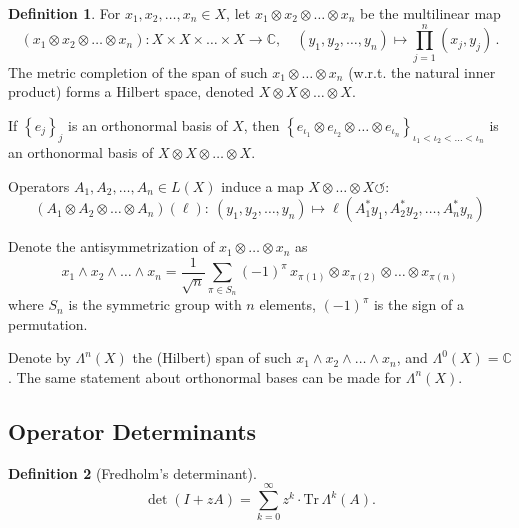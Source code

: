 \documentclass[a4paper]{article}
\newcommand{\Tr}{\textrm{Tr}\,}
\newcommand{\bbC}{\mathbb{C}}
\theoremstyle{definition}
\newtheorem{definition}{Definition}[section]
\theoremstyle{remark}
\theoremstyle{remark}
\begin{document}
\begin{definition}
    For $x_1, x_2, \ldots, x_n \in X$, let $x_1 \otimes x_2 \otimes \ldots \otimes x_n$ be the multilinear map 
    \begin{equation}
        (x_1 \otimes x_2 \otimes \ldots \otimes x_n) : X \times X \times \ldots \times X \to \bbC, \quad (y_1, y_2, \ldots, y_n) \mapsto \prod_{j=1}^{n} (x_j, y_j) \,. 
    \end{equation}
    The metric completion of the span of such $x_1 \otimes \ldots \otimes x_n$ (w.r.t. the natural inner product) forms a Hilbert space, denoted $X \otimes X \otimes \ldots \otimes X$. 

    If $\left\{ e_j \right\}_j$ is an orthonormal basis of $X$, then $\left\{ e_{\iota_1} \otimes e_{\iota_2} \otimes \ldots \otimes e_{\iota_n} \right\}_{\iota_1 < \iota_2 < \ldots < \iota_n}$ is an orthonormal basis of $X \otimes X \otimes \ldots \otimes X$. 

    Operators $A_1, A_2, \ldots, A_n \in L(X)$ induce a map $X \otimes \ldots \otimes X \circlearrowleft$: 
    \begin{equation}
        (A_1 \otimes A_2 \otimes \ldots \otimes A_n)(\ell) :\  (y_1, y_2, \ldots, y_n) \mapsto \ell (A_1^* y_1, A_2^* y_2, \ldots, A_n^* y_n)
    \end{equation}

    Denote the antisymmetrization of $x_1 \otimes \ldots \otimes x_n$ as 
    \begin{equation}
        x_1 \wedge x_2 \wedge \ldots \wedge x_n = \frac{1}{\sqrt{n}}  \sum_{\pi \in S_n} (-1)^\pi\, x_{\pi (1)} \otimes x_{\pi (2)} \otimes \ldots \otimes x_{\pi (n)} 
    \end{equation}
    where $S_n$ is the symmetric group with $n$ elements, $(-1)^\pi$ is the sign of a permutation. 

    Denote by $\Lambda^n (X)$ the (Hilbert) span of such $x_1 \wedge x_2 \wedge \ldots \wedge x_n$, and $\Lambda^0 (X) = \bbC$. The same statement about orthonormal bases can be made for $\Lambda^n (X)$. 
\end{definition}

\subsection{Operator Determinants}

\begin{definition}[Fredholm's determinant]
    \begin{equation}
        \det (I + z A) = \sum_{k=0}^{\infty} z^k \cdot \Tr \Lambda^k (A) . 
    \end{equation}
\end{definition}
\end{document}
